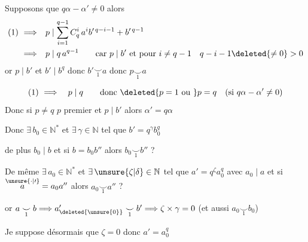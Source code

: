 Supposons que $q\alpha-\alpha'\ne0$ alors
\[
\begin{aligned}
(1)\ \Longrightarrow\quad &p\mid\sum_{i=1}^{q-1}C_q^i\,a^i b'^{\,q-i-1}+b'^{\,q-1}\\
\Longrightarrow\quad &p\mid q\,a^{q-1}\qquad\text{car }p\mid b'\ \text{et pour }i\ne q-1\quad q-i-1\deleted{\ne0}>0
\end{aligned}
\]
or $p\mid b'$ et $b'\mid b^q$ donc $b'\mathrel{\underset{1}{\smile}}a$ donc $p\mathrel{\underset{1}{\smile}}a$

\[
(1)\ \Longrightarrow\quad p\mid q\qquad\text{donc }\deleted{p=1\ \text{ou }}p=q\quad(\text{si }q\alpha-\alpha'\ne0)
\]
Donc si $p\ne q$ \quad $p$ premier  et $p\mid b'$ alors $\alpha'=q\alpha$
\begin{flushright}
\end{flushright}

Donc $\exists\,b_0\in\mathbb N^*$ et $\exists\,\gamma\in\mathbb N$ tel que $b'=q^\gamma b_0^q$ 

de plus $b_0\mid b$ et si $b=b_0 b''$ alors $b_0\mathrel{\underset{1}{\smile}}b''$ ?

De même $\exists\,a_0\in\mathbb N^*$ et $\exists\,\unsure{\zeta|\delta}\in\mathbb N$ tel que $a'=q^\zeta a_0^q$ avec $a_0\mid a$ et si $\overset{\unsure{\cdot|\prime}}{a}=a_0a''$ alors $a_0\mathrel{\underset{1}{\smile}}a''$ ?

or $a\mathrel{\underset{1}{\smile}}b\Longrightarrow a_{\deleted{\unsure{0}}}'\mathrel{\underset{1}{\smile}}b'\Longrightarrow\zeta\times\gamma=0$ (et aussi $a_0\mathrel{\underset{1}{\smile}}b_0$)

Je suppose désormais que $\zeta=0$ donc $a'=a_0^q$

